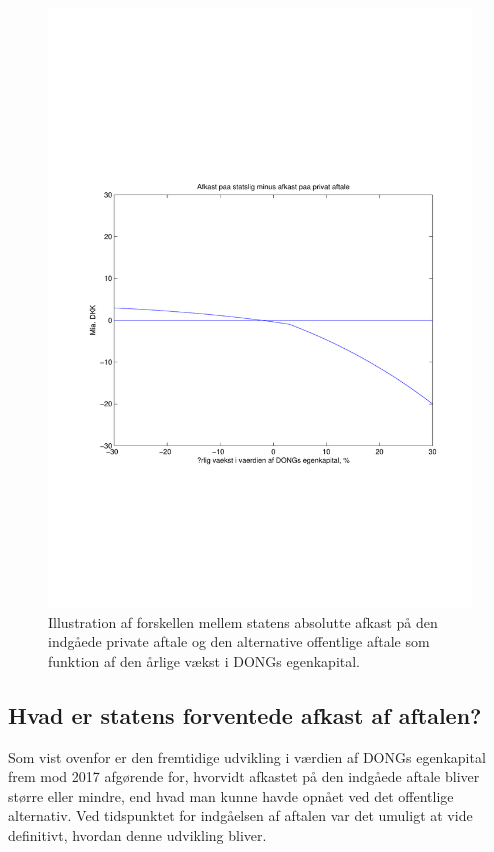 \documentclass{article}
\begin{document}
\begin{figure}
\includegraphics[scale=0.8]{../matlab/figs/private_less_public_deal.pdf}
\caption{Illustration af forskellen mellem statens absolutte afkast p\aa{} den indg\aa{}ede private aftale og den alternative offentlige aftale som funktion af den \aa{}rlige v\ae{}kst i DONGs egenkapital. }
\label{fig:comp}
\end{figure}


\subsection{Hvad er statens forventede afkast af aftalen?}

Som vist ovenfor er den fremtidige udvikling i værdien af DONGs egenkapital frem mod 2017 afgørende for, hvorvidt afkastet på den indgåede aftale bliver større eller mindre, end hvad man kunne havde opnået ved det offentlige alternativ. Ved tidspunktet for indgåelsen af aftalen var det umuligt at vide definitivt, hvordan denne udvikling bliver. 
\end{document}

